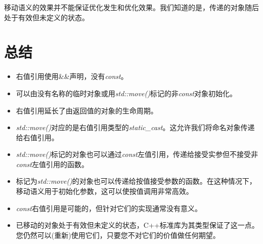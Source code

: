 移动语义的效果并不能保证优化发生和优化效果。我们知道的是，传递的对象随后处于有效但未定义的状态。\par


\section{总结}

\begin{itemize}
  \item 右值引用使用\&\&声明，没有\textit{const}。
  \item 可以由没有名称的临时对象或用\textit{std::move()}标记的非\textit{const}对象初始化。
  \item 右值引用延长了由返回值的对象的生命周期。
  \item \textit{std::move()}对应的是右值引用类型的\textit{static\_\allowbreak{}cast}。这允许我们将命名对象传递给右值引用。
  \item \textit{std::move()}标记的对象也可以通过\textit{const}左值引用，传递给接受实参但不接受非\textit{const}左值引用的函数。
  \item 标记为\textit{std::move()}的对象也可以传递给按值接受参数的函数。在这种情况下，移动语义用于初始化参数，这可以使按值调用非常高效。
  \item \textit{const}右值引用是可能的，但针对它们的实现通常没有意义。
  \item 已移动的对象处于有效但未定义的状态，C++标准库为其类型保证了这一点。您仍然可以(重新)使用它们，只要您不对它们的价值做任何期望。
\end{itemize}
